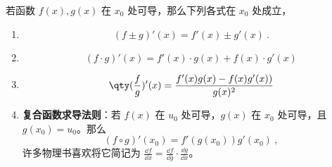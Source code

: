 

若函数 $f(x),g(x)$ 在 $x_0$ 处可导，那么下列各式在 $x_0$ 处成立，

\begin{enumerate}
\item 
\begin{equation}
(f\pm g)'(x)=f'(x)\pm g'(x)~.
\end{equation}
\item 
\begin{equation}
(f\cdot g)'(x)=f'(x)\cdot g(x)+f(x)\cdot g'(x)
\end{equation}
\item 
\begin{equation}
\qty(\frac{f}{g})'(x)=\frac{f'(x)g(x)-f(x)g'(x))}{g(x)^2}
\end{equation}
\item \textbf{复合函数求导法则}：若 $f(x)$ 在 $u_0$ 处可导，$g(x)$ 在 $x_0$ 处可导，且 $g(x_0)=u_0$。那么 
\begin{equation}
(f\circ g)'(x_0)=f'(g(x_0))g'(x_0)~,
\end{equation}
许多物理书喜欢将它简记为 $\frac{\dd f}{\dd x}=\frac{\dd f}{\dd g} \cdot \frac{\dd g}{\dd x}$。
\end{enumerate}


